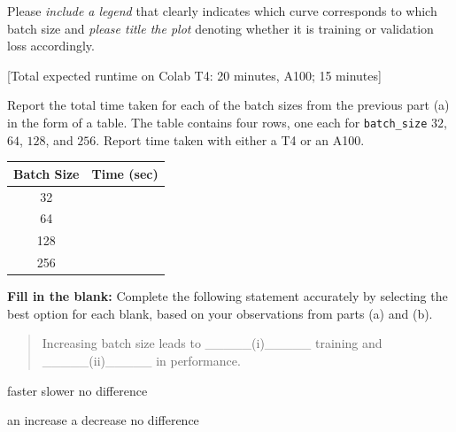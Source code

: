 \documentclass[11pt,addpoints,answers]{exam}
\begin{document}
\begin{questions}
\begin{parts}
\begin{subparts}
    Please \emph{include a legend} that clearly indicates which curve corresponds to which batch size and \emph{please title the plot} denoting whether it is training or validation loss accordingly.

    {[}Total expected runtime on Colab T4: 20 minutes, A100; 15 minutes{]}
    
    \begin{your_solution}[height=7cm,width=16cm]
    \end{your_solution}
    
    \subpart[2] Report the total time taken for each of the batch sizes from the previous part (a) in the form of a table. The table contains four rows, one each for \texttt{batch\_size} $32$, $64$, $128$, and $256$. Report time taken with either a T4 or an A100.
    
    \begin{center}
        \begin{tabular}{c|c}
            \toprule
            {\bf Batch Size}   & {\bf Time (sec)}  \\
            \midrule
            32 &   \\
            64 &   \\
            128 &   \\
            256 &   \\
            \bottomrule
        \end{tabular}
    \end{center}
    
    \clearpage

    \subpart[2] \textbf{Fill in the blank:} Complete the following statement accurately by selecting the best option for each blank, based on your observations from parts (a) and (b).  
    \doublespacing
    \begin{quote}
        Increasing batch size leads to \_\_\_\_\_(i)\_\_\_\_\_ training  and \_\_\_\_\_(ii)\_\_\_\_\_ in performance.\\

            
    \end{quote}
    \singlespacing
    \begin{subsubparts}
    \subsubpart 
    \begin{checkboxes} 
    \choice faster \choice slower \choice no difference \end{checkboxes}
    \subsubpart
    \begin{checkboxes} 
    \choice an increase \choice a decrease \choice no difference \end{checkboxes}
    \end{subsubparts}
\end{subparts}



\end{parts}
\end{questions}
\end{document}
